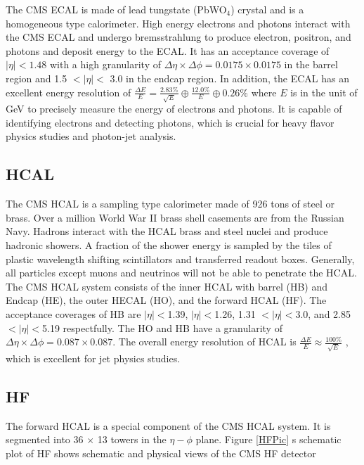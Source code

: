 The CMS ECAL is made of lead tungstate (PbWO$_4$) crystal and is a homogeneous type calorimeter. High energy electrons and photons interact with the CMS ECAL and undergo bremsstrahlung to produce electron, positron, and photons and deposit energy to the ECAL. It has an acceptance coverage of $|\eta| < 1.48$ with a high granularity of $\Delta \eta \times \Delta \phi = 0.0175 \times 0.0175$ in the barrel region and 1.5 $< |\eta| <$ 3.0 in the endcap region. In addition, the ECAL has an excellent energy resolution of $\frac{\Delta E}{E} = \frac{2.83\%}{\sqrt {E}} \oplus \frac{12.0\%}{E}  \oplus 0.26\%$ where $E$ is in the unit of GeV \cite{ECALReso} to precisely measure the energy of electrons and photons. It is capable of identifying electrons and detecting photons, which is crucial for heavy flavor physics studies and photon-jet analysis. 

\subsection{HCAL}

The CMS HCAL is a sampling type calorimeter made of 926 tons of steel or brass. Over a million World War II brass shell casements are from the Russian Navy. Hadrons interact with the HCAL brass and steel nuclei and produce hadronic showers. A fraction of the shower energy is sampled by the tiles of plastic wavelength shifting scintillators and transferred readout boxes. Generally, all particles except muons and neutrinos will not be able to penetrate the HCAL. The CMS HCAL system consists of the inner HCAL with barrel (HB) and Endcap (HE), the outer HECAL (HO), and the forward HCAL (HF). The acceptance coverages of HB are $|\eta| < $1.39, $|\eta| < $1.26, 1.31 $< |\eta| < $3.0, and 2.85 $< |\eta| < $5.19 respectfully. The HO and HB have a granularity of $\Delta \eta \times \Delta \phi = 0.087 \times 0.087$. The overall energy resolution of HCAL is $\frac{\Delta E}{E} \approx \frac{100\%}{\sqrt {E}}$ \cite{HCALReport}, which is excellent for jet physics studies.

\subsection{HF}

The forward HCAL is a special component of the CMS HCAL system. It is segmented into 36 $\times$ 13 towers in the $\eta - \phi$ plane. Figure \ref{HFPic} s schematic plot of HF shows schematic and physical views of the CMS HF detector \cite{HFInfo}

